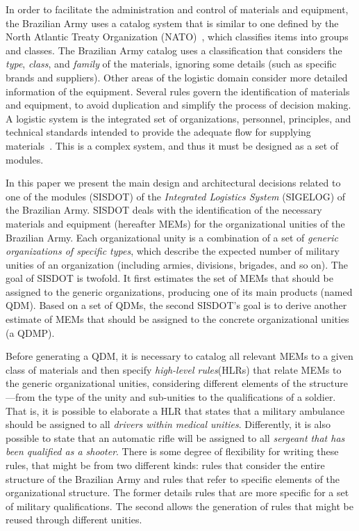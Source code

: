 \documentclass[twocolumn]{bmcart}%
\newcommand{\callers}{\emph{high-level rules}\xspace}
\newcommand{\shc}{HLR\xspace}
\begin{document}
In order to facilitate the administration and control of materials and equipment, the Brazilian Army uses a catalog system that is similar to one defined by the North Atlantic Treaty Organization (NATO)~\cite{otan2012}, which classifies items into groups and classes. The Brazilian Army catalog uses a classification that considers the \emph{type}, \emph{class}, and \emph{family} of the materials, ignoring some details (such as specific brands and suppliers). Other areas of the logistic domain consider more detailed information of the equipment. Several rules govern the identification of materials and equipment, to avoid duplication and simplify the process of decision making. A logistic system is the integrated set of organizations, personnel, principles, and technical standards intended to provide the adequate flow for supplying materials~\cite{brasil2003}. This is a complex system, and thus it must be designed as a set of modules. 

In this paper we present the main design and architectural decisions related to one of the modules (SISDOT) of the \emph{Integrated Logistics System} (SIGELOG) of the Brazilian Army. SISDOT deals with the identification of the necessary materials and equipment (hereafter MEMs) for the organizational unities of the Brazilian Army. Each organizational unity is a combination of a set of \emph{generic organizations of specific types}, which describe the expected number of military unities of an organization (including armies, divisions, brigades, and so on). The goal of SISDOT is twofold. It first estimates the set of MEMs that should be assigned to the generic organizations, producing one of its main products (named QDM). Based on a set of QDMs, the second SISDOT's goal is to derive another estimate of MEMs that should be assigned to the concrete organizational unities (a QDMP). 

Before generating a QDM, it is necessary to catalog all relevant MEMs to a given class of materials and then specify \callers (HLRs) that relate MEMs to the generic organizational unities, considering different elements of the structure---from the type of the unity and sub-unities to the qualifications of a soldier. That is, it is possible to elaborate a \shc that states that a military ambulance should be assigned to all \emph{drivers within medical unities}. Differently, it is also possible to state that an automatic rifle will be assigned to all \emph{sergeant that has been qualified as a shooter}. There is some degree of flexibility for writing these rules, that might be from two different kinds: rules that consider the entire structure of the Brazilian Army and rules that refer to specific elements of the organizational structure. The former details rules that are more specific for a set of military qualifications. The second allows the generation of rules that might be reused through different unities. 
\end{document}
